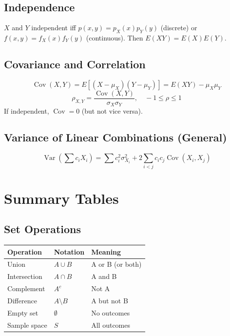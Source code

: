 \documentclass[11pt]{article}
\begin{document}
\subsection*{Independence}
\(X\) and \(Y\) independent iff \(p(x,y)=p_X(x)p_Y(y)\) (discrete) or \(f(x,y)=f_X(x)f_Y(y)\) (continuous). Then \(E(XY)=E(X)E(Y)\).

\subsection*{Covariance and Correlation}
\[
\operatorname{Cov}(X,Y)=E[(X-\mu_X)(Y-\mu_Y)]=E(XY)-\mu_X\mu_Y
\]
\[
\rho_{X,Y}=\frac{\operatorname{Cov}(X,Y)}{\sigma_X\sigma_Y},\quad -1\le\rho\le1
\]
If independent, \(\operatorname{Cov}=0\) (but not vice versa).

\subsection*{Variance of Linear Combinations (General)}
\[
\operatorname{Var}\left(\sum c_i X_i\right)=\sum c_i^2\sigma_{X_i}^2+2\sum_{i<j}c_ic_j\operatorname{Cov}(X_i,X_j)
\]

\section*{Summary Tables}
\subsection*{Set Operations}
\begin{center}
\begin{tabular}{l l l}
\toprule
\textbf{Operation} & \textbf{Notation} & \textbf{Meaning} \\
\midrule
Union & \(A \cup B\) & A or B (or both) \\
Intersection & \(A \cap B\) & A and B \\
Complement & \(A^c\) & Not A \\
Difference & \(A \setminus B\) & A but not B \\
Empty set & \(\emptyset\) & No outcomes \\
Sample space & \(S\) & All outcomes \\
\bottomrule
\end{tabular}
\end{center}
\end{document}
